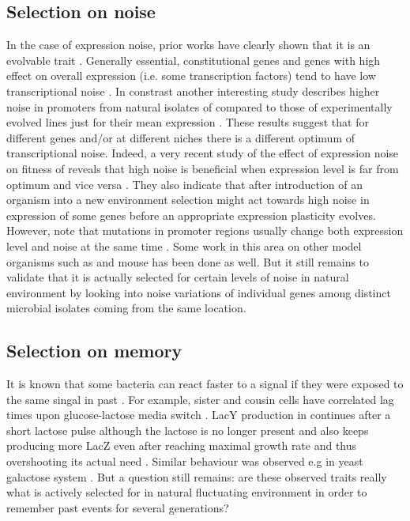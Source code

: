 \subsection{Selection on noise}
In the case of expression noise, prior works have clearly shown that it is an evolvable trait \cite{richard2014does}.
Generally essential, constitutional genes and genes with high effect on overall expression (i.e. some transcription factors) tend to have low transcriptional noise \cite{silander2012genome, metzger2015selection}.
In constrast another interesting study describes higher noise in promoters from natural isolates of  compared to those of experimentally evolved lines just for their mean expression \cite{wolf2015expression}.
These results suggest that for different genes and/or at different niches there is a different optimum of transcriptional noise.
Indeed, a very recent study of the effect of expression noise on fitness of  reveals that high noise is beneficial when expression level is far from optimum and vice versa \cite{duveau2018fitness}.
They also indicate that after introduction of an organism into a new environment selection might act towards high noise in expression of some genes before an appropriate expression plasticity evolves.
However, note that mutations in promoter regions usually change both expression level and noise at the same time \cite{metzger2015selection}.
Some work in this area on other model organisms such as  \cite{schor2017promoter} and mouse \cite{barroso2017evolution} has been done as well.
But it still remains to validate that it is actually selected for certain levels of noise in natural environment by looking into noise variations of individual genes among distinct microbial isolates coming from the same location.

\subsection{Selection on memory}
It is known that some bacteria can react faster to a signal if they were exposed to the same singal in past \cite{novick1957enzyme}.
For example, sister and cousin cells have correlated lag times upon glucose-lactose media switch \cite{boulineau2013single, kaiser2018monitoring}.
LacY production in  continues after a short lactose pulse although the lactose is no longer present \cite{lambert2014memory} and  also keeps producing more LacZ even after reaching maximal growth rate and thus overshooting its actual need \cite{kaiser2018monitoring}.
Similar behaviour was observed e.g in yeast galactose system \cite{zacharioudakis2007yeast, razinkov2013measuring}.
But a question still remains: are these observed traits really what is actively selected for in natural fluctuating environment in order to remember past events for several generations?

